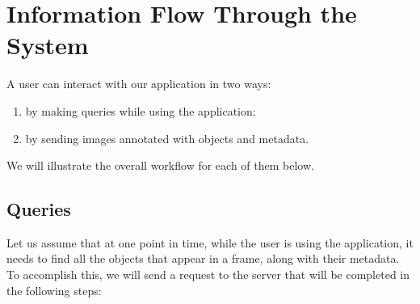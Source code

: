 \documentclass[a4paper,onecolumn,oneside,titlepage,11pt]{report}
\begin{document}
\chapter{Information Flow Through the System}
\label{chap:system-workflow}
A user can interact with our application in two ways:
\begin{enumerate}
	\item by making queries while using the application;
	\item by sending images annotated with objects and metadata.
\end{enumerate}
We will illustrate the overall workflow for each of them below.

\section{Queries}
Let us assume that at one point in time, while the user is using the application, it needs to find all the objects that appear in a frame, along with their metadata. To accomplish this, we will send a request to the server that will be completed in the following steps:
\end{document}
